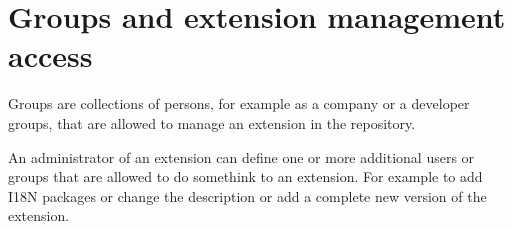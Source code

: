 \section[sec:groups]{Groups and extension management access}

Groups are collections of persons, for example as a company or a developer groups, that are allowed to manage an extension in the repository.

An administrator of an extension can define one or more additional users or groups that are allowed to do somethink to an extension. For example to add I18N packages or change the description or add a complete new version of the extension.
